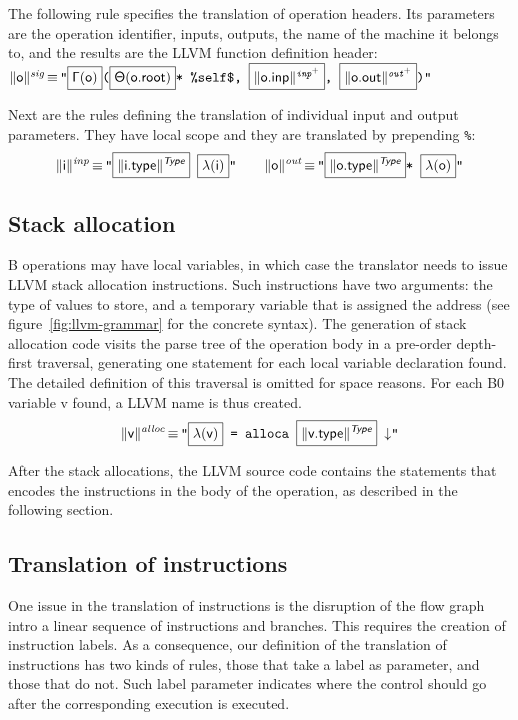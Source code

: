 \documentclass{llncs}
\newcommand{\trad}[2]{\ensuremath{\lVert \textsf{#1} \rVert^{\textit{#2}}}}
\newcommand{\nl}[0]{\ensuremath{\downarrow}}
\DeclareMathOperator{\isdef}{\equiv}
\newcommand{\llvm}[1]{\texttt{#1}}
\newcommand{\B}[1]{\textsf{#1}}
\newcommand{\ListOf}[1]{$\mbox{#1}^+$}
\newcommand{\PH}[1]{\framebox{$#1$}}
\newcommand{\Global}[0]{\ensuremath{\sf\Gamma}}
\newcommand{\local}[0]{\ensuremath{\sf\lambda}}
\newcommand{\state}[0]{\ensuremath{\sf\Theta}}
\begin{document}
\begin{enumerate}
The following rule specifies the translation of operation headers. Its
parameters are the operation identifier, inputs, outputs, the name of the
machine it belongs to, and the results are the LLVM function definition
header: \\
\noindent$\trad{\B{o}}{sig} \isdef \llvm{"\PH{\Global(\B{o})}(\PH{\state(\B{o.root})}* \%self\$, \PH{\trad{\B{o.inp}}{\ListOf{inp}}}, \PH{\trad{\B{o.out}}{\ListOf{out}}})"}$

Next are the rules defining the translation of individual input and output
parameters. They have local scope and they are translated by prepending
\llvm{\%}:
\begin{align*}
  \trad{i}{inp} \isdef 
  \llvm{"\PH{\trad{i.type}{\B{Type}}} \PH{\local(\B{i})}"} \quad \quad
  \trad{o}{out} \isdef 
  \llvm{"\PH{\trad{o.type}{\B{Type}}}* \PH{\local(\B{o})}"}
\end{align*}

\subsection{Stack allocation}
\label{sec:trad-alloc}

B operations may have local variables, in which case the translator needs to
issue LLVM stack allocation instructions. Such instructions have two arguments:
the type of values to store, and a temporary variable that is assigned the
address (see figure~\ref{fig:llvm-grammar} for the concrete syntax). The
generation of stack allocation code visits the parse tree of the operation body
in a pre-order depth-first traversal, generating one statement for each local
variable declaration found. The detailed definition of this traversal is omitted
for space reasons. For each B0 variable \B{v} found, a LLVM name is thus
created.
\begin{align*}
  \trad{v}{alloc} \isdef 
  \llvm{"\PH{\local(\B{v})} = alloca \PH{\trad{v.type}{\B{Type}}} \nl"}
\end{align*}

After the stack allocations, the LLVM source code contains the statements that
encodes the instructions in the body of the operation, as described in the
following section.

\subsection{Translation of instructions}
\label{sec:trad-instr}

One issue in the translation of instructions is the disruption of the flow graph
intro a linear sequence of instructions and branches. This requires the creation
of instruction labels. As a consequence, our definition of the translation of
instructions has two kinds of rules, those that take a label as parameter, and
those that do not. Such label parameter indicates where the control should go
after the corresponding execution is executed.


\end{enumerate}
\end{document}
